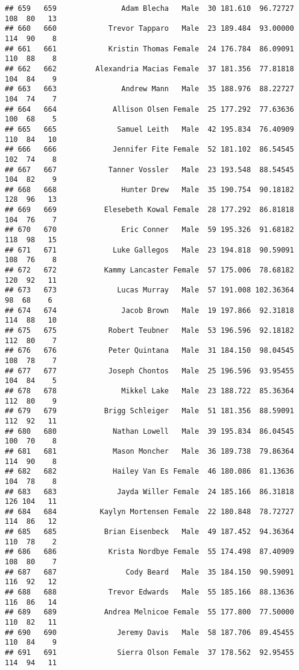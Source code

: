 \documentclass[
]{article}
\begin{document}
\begin{verbatim}
## 659   659               Adam Blecha   Male  30 181.610  96.72727 108  80   13
## 660   660            Trevor Tapparo   Male  23 189.484  93.00000 114  90    8
## 661   661            Kristin Thomas Female  24 176.784  86.09091 110  88    8
## 662   662         Alexandria Macias Female  37 181.356  77.81818 104  84    9
## 663   663               Andrew Mann   Male  35 188.976  88.22727 104  74    7
## 664   664             Allison Olsen Female  25 177.292  77.63636 100  68    5
## 665   665              Samuel Leith   Male  42 195.834  76.40909 110  84   10
## 666   666             Jennifer Fite Female  52 181.102  86.54545 102  74    8
## 667   667            Tanner Vossler   Male  23 193.548  88.54545 104  82    9
## 668   668               Hunter Drew   Male  35 190.754  90.18182 128  96   13
## 669   669           Elesebeth Kowal Female  28 177.292  86.81818 104  76    7
## 670   670               Eric Conner   Male  59 195.326  91.68182 118  98   15
## 671   671             Luke Gallegos   Male  23 194.818  90.59091 108  76    8
## 672   672           Kammy Lancaster Female  57 175.006  78.68182 120  92   11
## 673   673              Lucas Murray   Male  57 191.008 102.36364  98  68    6
## 674   674               Jacob Brown   Male  19 197.866  92.31818 114  88   10
## 675   675            Robert Teubner   Male  53 196.596  92.18182 112  80    7
## 676   676            Peter Quintana   Male  31 184.150  98.04545 108  78    7
## 677   677            Joseph Chontos   Male  25 196.596  93.95455 104  84    5
## 678   678               Mikkel Lake   Male  23 188.722  85.36364 112  80    9
## 679   679           Brigg Schleiger   Male  51 181.356  88.59091 112  92   11
## 680   680             Nathan Lowell   Male  39 195.834  86.04545 100  70    8
## 681   681             Mason Moncher   Male  36 189.738  79.86364 114  90    8
## 682   682             Hailey Van Es Female  46 180.086  81.13636 104  78    8
## 683   683              Jayda Willer Female  24 185.166  86.31818 126 104   11
## 684   684          Kaylyn Mortensen Female  22 180.848  78.72727 114  86   12
## 685   685           Brian Eisenbeck   Male  49 187.452  94.36364 110  78    2
## 686   686            Krista Nordbye Female  55 174.498  87.40909 108  80    7
## 687   687                Cody Beard   Male  35 184.150  90.59091 116  92   12
## 688   688            Trevor Edwards   Male  55 185.166  88.13636 116  86   14
## 689   689           Andrea Melnicoe Female  55 177.800  77.50000 110  82   11
## 690   690              Jeremy Davis   Male  58 187.706  89.45455 110  84    9
## 691   691              Sierra Olson Female  37 178.562  92.95455 114  94   11

\end{verbatim}
\end{document}
